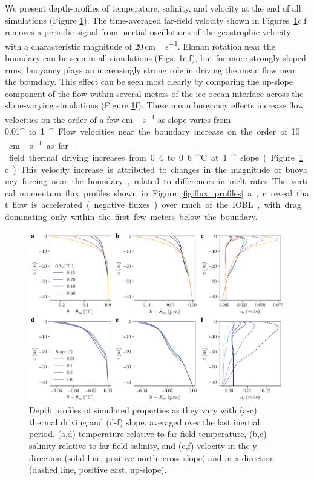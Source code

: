 \documentclass[tc, manuscript]{copernicus}
\begin{document}
We present depth-profiles of temperature, salinity, and velocity at the end of all simulations (Figure \ref{fig:dT_profiles}). The time-averaged far-field velocity shown in Figures~\ref{fig:dT_profiles}c,f removes a periodic signal from inertial oscillations of the geostrophic velocity with a characteristic magnitude of 20\,\unit{cm\,s^{-1}}. Ekman rotation near the boundary can be seen in all simulations (Figs. \ref{fig:dT_profiles}c,f), but for more strongly sloped runs, buoyancy plays an increasingly strong role in driving the mean flow near the boundary. This effect can be seen most clearly by comparing the up-slope component of the flow within several meters of the ice-ocean interface across the slope-varying simulations (Figure \ref{fig:dT_profiles}f). These mean buoyancy effects increase flow velocities on the order of a few \unit{cm\,s^{-1}} as slope varies from 0.01\unit{^{\circ}} to 1\unit{^{\circ}}. Flow velocities near the boundary increase on the order of 10\,\unit{cm\,s^{-1}} as far-field thermal driving increases from 0.4 to 0.6\unit{^{\circ}C} at 1\unit{^{\circ}} slope (Figure \ref{fig:dT_profiles}c). This velocity increase is attributed to changes in the magnitude of buoyancy forcing near the boundary, related to differences in melt rates. The vertical momentum flux profiles shown in Figure~\ref{fig:flux_profiles}a,c reveal that flow is accelerated (negative fluxes) over much of the IOBL, with drag dominating only within the first few meters below the boundary.
 

\begin{figure}[t]
\includegraphics[width=12cm]{fig2.pdf}
\caption{Depth profiles of simulated properties as they vary with (a-c) thermal driving and (d-f) slope, averaged over the last inertial period. (a,d) temperature relative to far-field temperature, (b,e) salinity relative to far-field salinity, and (c,f) velocity in the y-direction (solid line, positive north, cross-slope) and in x-direction (dashed line, positive east, up-slope). }
\label{fig:dT_profiles}
\end{figure}
\end{document}
